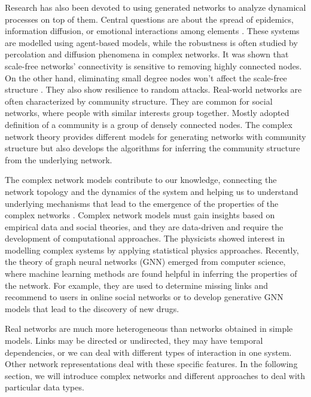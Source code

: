 Research has also been devoted to using generated networks to analyze dynamical processes on top of them. Central questions are about the spread of epidemics, information diffusion, or emotional interactions among elements \cite{garas2012emotional}. These systems are modelled using agent-based models, while the robustness is often studied by percolation and diffusion phenomena in complex networks. It was shown that scale-free networks' connectivity is sensitive to removing highly connected nodes. On the other hand, eliminating small degree nodes won't affect the scale-free structure \cite{cohen2000resilience}. They also show resilience to random attacks. Real-world networks are often characterized by community structure. They are common for social networks, where people with similar interests group together. Mostly adopted definition of a community is a group of densely connected nodes. The complex network theory provides different models for generating networks with community structure but also develops the algorithms for inferring the community structure from the underlying network. 

The complex network models contribute to our knowledge, connecting the network topology and the dynamics of the system and helping us to understand underlying mechanisms that lead to the emergence of the properties of the complex networks \cite{barabasi1999, tadic2001, mitrovic2009, ghoshal2013uncovering}. %
Complex network models must gain insights based on empirical data and social theories, and they are data-driven and require the development of computational approaches. The physicists showed interest in modelling complex systems by applying statistical physics approaches. Recently, the theory of graph neural networks (GNN) emerged from computer science, where machine learning methods are found helpful in inferring the properties of the network. For example, they are used to determine missing links and recommend to users in online social networks or to develop generative GNN models that lead to the discovery of new drugs.  

Real networks are much more heterogeneous than networks obtained in simple models. Links may be directed or undirected, they may have temporal dependencies, or we can deal with different types of interaction in one system. Other network representations deal with these specific features. In the following section, we will introduce complex networks and different approaches to deal with particular data types. 

